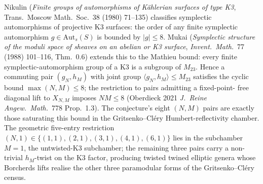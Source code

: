 \begin{remark}
\label{rem:nikulin-bound-joint}
Nikulin (\emph{Finite groups of automorphisms of K\"ahlerian surfaces
of type K3}, Trans.\ Moscow Math.\ Soc.~38 (1980) 71--135) classifies
symplectic automorphisms of projective K3 surfaces: the order of any
finite symplectic automorphism $g \in \mathrm{Aut}_s(S)$ is bounded
by $|g| \leq 8$. Mukai (\emph{Symplectic structure of the moduli space
of sheaves on an abelian or K3 surface}, \emph{Invent.\ Math.}~77
(1988) 101--116, Thm.~0.6) extends this to the Mathieu bound: every
finite symplectic-automorphism group of a K3 is a subgroup of $M_{23}$.
Hence a commuting pair $(g_N, h_M)$ with joint group
$\langle g_N, h_M \rangle \leq M_{23}$ satisfies the cyclic bound
$\max(N, M) \leq 8$; the restriction to pairs admitting a fixed-point-
free diagonal lift to $X_{N, M}$ imposes $N M \leq 8$
(Oberdieck 2021 \emph{J.\ Reine Angew.\ Math.}~778 Prop.~1.3). The
conjecture's eight $(N, M)$ pairs are exactly those saturating this
bound in the Gritsenko--Cl\'ery Humbert-reflectivity chamber. The
geometric five-entry restriction
$(N, 1) \in \{(1,1), (2,1), (3,1), (4,1), (6,1)\}$ lies in the
subchamber $M = 1$, the untwisted-K3 subchamber; the remaining three
pairs carry a non-trivial $h_M$-twist on the K3 factor, producing
twisted twined elliptic genera whose Borcherds lifts realise the
other three paramodular forms of the Gritsenko--Cl\'ery census.
\end{remark}

